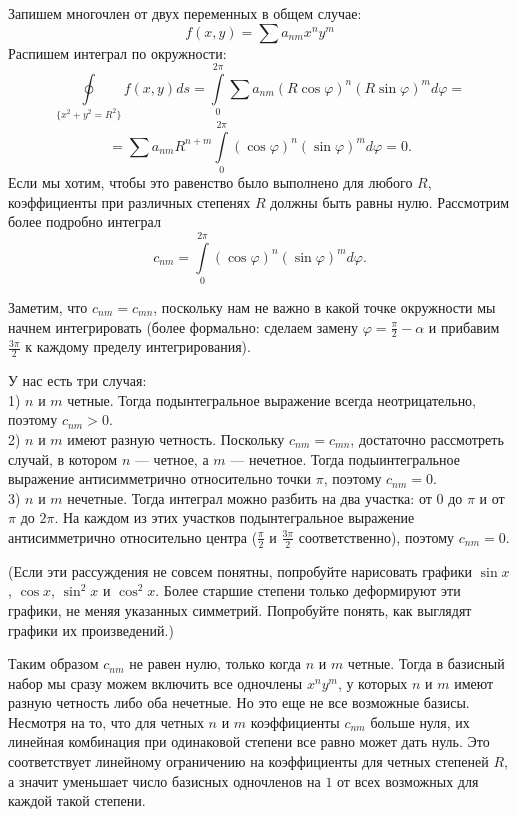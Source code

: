 \documentclass{article}
\begin{document}
Запишем многочлен от двух переменных в общем случае:
$$f(x, y) = \sum a_{nm} x^n y^m$$
Распишем интеграл по окружности:
$$\oint\limits_{\{x^2+y^2=R^2\}} f(x,y) ds = \int\limits_0^{2\pi} \sum a_{nm} (R\cos \varphi)^n (R\sin \varphi)^m d\varphi = $$
$$ = \sum a_{nm} R^{n+m} \int\limits_0^{2\pi} (\cos \varphi)^n (\sin \varphi)^m d\varphi = 0.$$
Если мы хотим, чтобы это равенство было выполнено для любого $R$, коэффициенты при различных степенях $R$ должны быть равны нулю.
Рассмотрим более подробно интеграл 
$$c_{nm} = \int\limits_0^{2\pi} (\cos \varphi)^n (\sin \varphi)^m d\varphi.$$

Заметим, что $c_{nm} = c_{mn}$, поскольку нам не важно в какой точке окружности мы начнем интегрировать (более формально: сделаем замену $\varphi = \frac{\pi}{2} - \alpha$ 
и прибавим $\frac{3\pi}{2}$ к каждому пределу интегрирования).

У нас есть три случая:\\
1) $n$ и $m$ четные. Тогда подынтегральное выражение всегда неотрицательно, поэтому $c_{nm} > 0$.\\
2) $n$ и $m$ имеют разную четность. Поскольку $c_{nm} = c_{mn}$, достаточно рассмотреть случай, в котором $n$ --- четное, а $m$ --- нечетное. Тогда 
подыинтегральное выражение антисимметрично относительно точки $\pi$, поэтому $c_{nm} = 0$.\\
3) $n$ и $m$ нечетные. Тогда интеграл можно разбить на два участка: от $0$ до $\pi$ и от $\pi$ до $2\pi$. На каждом из этих участков подынтегральное выражение антисимметрично 
относительно центра ($\frac{\pi}{2}$ и $\frac{3\pi}{2}$ соответственно), поэтому $c_{nm} = 0$.

(Если эти рассуждения не совсем понятны, попробуйте нарисовать графики $\sin x$, $\cos x$, $\sin^2 x$ и $\cos^2 x$. Более старшие степени только деформируют эти графики, 
не меняя указанных симметрий. Попробуйте понять, как выглядят графики их произведений.)

Таким образом $c_{nm}$ не равен нулю, только когда $n$ и $m$ четные. Тогда в базисный набор мы сразу можем включить все одночлены $x^n y^m$, у которых 
$n$ и $m$ имеют разную четность либо оба нечетные. Но это еще не все возможные базисы. Несмотря на то, что для четных $n$ и $m$ коэффициенты $c_{nm}$ 
больше нуля, их линейная комбинация при одинаковой степени все равно может дать нуль. Это соответствует линейному ограничению на коэффициенты для 
четных степеней $R$, а значит уменьшает число базисных одночленов на $1$ от всех возможных для каждой такой степени.
\end{document}
